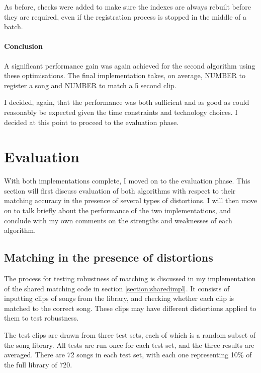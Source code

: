 \documentclass[12pt,a4paper,twoside,openright]{report}
\begin{document}
As before, checks were added to make sure the indexes are always rebuilt before they are required, even if the registration process is stopped in the middle of a batch.


\subsubsection{Conclusion}

A significant performance gain was again achieved for the second algorithm using these optimisations. The final implementation takes, on average, NUMBER to register a song and NUMBER to match a 5 second clip. %

I decided, again, that the performance was both sufficient and as good as could reasonably be expected given the time constraints and technology choices. I decided at this point to proceed to the evaluation phase.



\chapter{Evaluation}
\label{evaluation}

With both implementations complete, I moved on to the evaluation phase. This section will first discuss evaluation of both algorithms with respect to their matching accuracy in the presence of several types of distortions. I will then move on to talk briefly about the performance of the two implementations, and conclude with my own comments on the strengths and weaknesses of each algorithm.


\section{Matching in the presence of distortions}

The process for testing robustness of matching is discussed in my implementation of the shared matching code in section \ref{section:sharedimpl}. It consists of inputting clips of songs from the library, and checking whether each clip is matched to the correct song. These clips may have different distortions applied to them to test robustness.

The test clips are drawn from three test sets, each of which is a random subset of the song library. All tests are run once for each test set, and the three results are averaged. There are 72 songs in each test set, with each one representing 10\% of the full library of 720.
\end{document}

